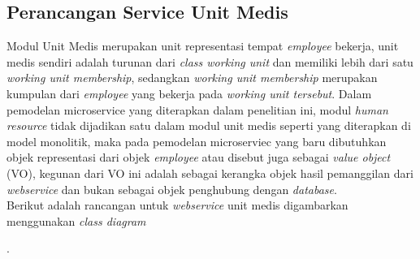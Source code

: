 \subsection{Perancangan Service Unit Medis}
Modul Unit Medis merupakan unit representasi tempat \textit{employee} bekerja, unit medis sendiri adalah turunan dari \textit{class working unit} dan memiliki lebih dari satu \textit{working unit membership}, sedangkan \textit{working unit membership} merupakan kumpulan dari \textit{employee} yang bekerja pada \textit{working unit tersebut}. Dalam pemodelan microservice yang diterapkan dalam penelitian ini, modul \textit{human resource} tidak dijadikan satu dalam modul unit medis seperti yang diterapkan di model monolitik, maka pada pemodelan microserviec yang baru dibutuhkan objek representasi dari objek \textit{employee} atau disebut juga sebagai \textit{value object} (VO), kegunan dari VO ini adalah sebagai kerangka objek hasil pemanggilan dari \textit{webservice} dan bukan sebagai objek penghubung dengan \textit{database}.\\
Berikut adalah rancangan untuk \textit{webservice} unit medis digambarkan menggunakan \textit{class diagram}

\begin{adjustbox}{width=1\textwidth}
	\begin{minipage}{\linewidth}
		.
	\end{minipage}
\end{adjustbox}

